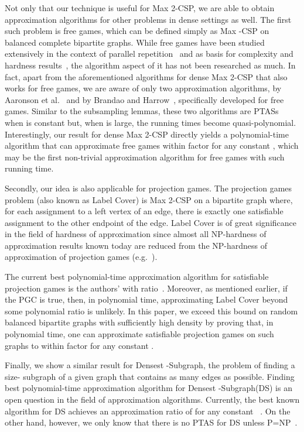 \documentclass{article}
\begin{document}
Not only that our technique is useful for {\sc Max 2-CSP}, we are able to obtain approximation algorithms for other problems in dense settings as well. The first such problem is free games, which can be defined simply as {\sc Max -CSP} on balanced complete bipartite graphs. While free games have been studied extensively in the context of parallel repetition~\cite{BRR+09, S13} and as basis for complexity and hardness results~\cite{AIM, BKW15}, the algorithm aspect of it has not been researched as much. In fact, apart from the aforementioned algorithms for dense {\sc Max 2-CSP} that also works for free games, we are aware of only two approximation algorithms, by Aaronson et al.~\cite{AIM} and by Brandao and Harrow~\cite{BH13}, specifically developed for free games. Similar to the subsampling lemmas, these two algorithms are PTASs when  is constant but, when  is large, the running times become quasi-polynomial. Interestingly, our result for dense {\sc Max 2-CSP} directly yields a polynomial-time algorithm that can approximate free games within  factor for any constant , which may be the first non-trivial approximation algorithm for free games with such running time.

Secondly, our idea is also applicable for projection games. The projection games problem (also known as {\sc Label Cover}) is {\sc Max 2-CSP} on a bipartite graph where, for each assignment to a left vertex of an edge, there is exactly one satisfiable assignment to the other endpoint of the edge. {\sc Label Cover} is of great significance in the field of hardness of approximation since almost all NP-hardness of approximation results known today are reduced from the NP-hardness of approximation of projection games (e.g.~\cite{BGS,Has97}).

The current best polynomial-time approximation algorithm for satisfiable projection games is the authors' with  ratio~\cite{MM13}. Moreover, as mentioned earlier, if the PGC is true, then, in polynomial time, approximating {\sc Label Cover} beyond some polynomial ratio is unlikely. In this paper, we exceed this bound on random balanced bipartite graphs with sufficiently high density by proving that, in polynomial time, one can approximate satisfiable projection games on such graphs to within  factor for any constant .

Finally, we show a similar result for {\sc Densest -Subgraph}, the problem of finding a size- subgraph of a given graph that contains as many edges as possible. Finding best polynomial-time approximation algorithm for {\sc Densest -Subgraph}({\sc DS}) is an open question in the field of approximation algorithms. Currently, the best known algorithm for {\sc DS} achieves an approximation ratio of  for any constant ~\cite{BCCFV}. On the other hand, however, we only know that there is no PTAS for {\sc DS} unless P=NP~\cite{Khot04}.
\end{document}
